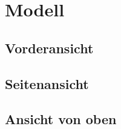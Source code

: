 \chapter{Modell}
\label{chp:Modell}

\section{Vorderansicht}
\label{sec:voderansicht}

\section{Seitenansicht}
\label{sec:seitenansicht}

\section{Ansicht von oben}
\label{sec:draufsicht}


